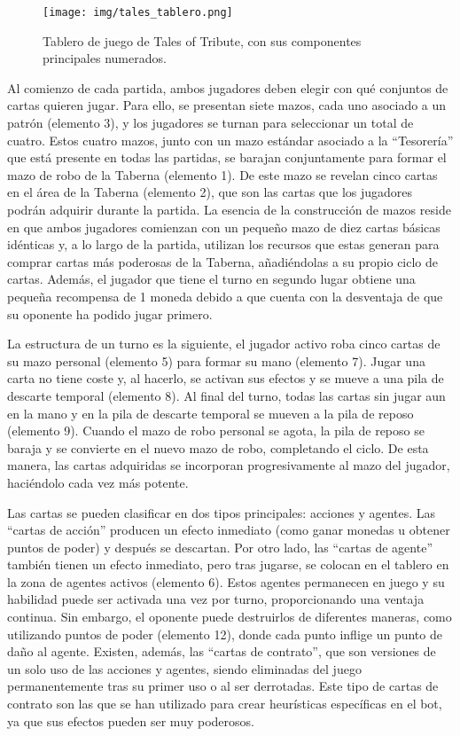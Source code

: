 \begin{figure}[H]
	\centering
	\texttt{[image: img/tales\_tablero.png]}
	\caption{Tablero de juego de Tales of Tribute, con sus componentes principales numerados. \cite{pixel_eso_2022}}
	\label{fig:tales_tablero}
\end{figure}

Al comienzo de cada partida, ambos jugadores deben elegir con qué conjuntos de cartas quieren jugar. Para ello, se presentan siete mazos, cada uno asociado a un patrón (elemento 3), y los jugadores se turnan para seleccionar un total de cuatro. Estos cuatro mazos, junto con un mazo estándar asociado a la ``Tesorería'' que está presente en todas las partidas, se barajan conjuntamente para formar el mazo de robo de la Taberna (elemento 1). De este mazo se revelan cinco cartas en el área de la Taberna (elemento 2), que son las cartas que los jugadores podrán adquirir durante la partida. La esencia de la construcción de mazos reside en que ambos jugadores comienzan con un pequeño mazo de diez cartas básicas idénticas y, a lo largo de la partida, utilizan los recursos que estas generan para comprar cartas más poderosas de la Taberna, añadiéndolas a su propio ciclo de cartas. Además, el jugador que tiene el turno en segundo lugar obtiene una pequeña recompensa de 1 moneda debido a que cuenta con la desventaja de que su oponente ha podido jugar primero.

La estructura de un turno es la siguiente, el jugador activo roba cinco cartas de su mazo personal (elemento 5) para formar su mano (elemento 7). Jugar una carta no tiene coste y, al hacerlo, se activan sus efectos y se mueve a una pila de descarte temporal (elemento 8). Al final del turno, todas las cartas sin jugar aun en la mano y en la pila de descarte temporal se mueven a la pila de reposo (elemento 9). Cuando el mazo de robo personal se agota, la pila de reposo se baraja y se convierte en el nuevo mazo de robo, completando el ciclo. De esta manera, las cartas adquiridas se incorporan progresivamente al mazo del jugador, haciéndolo cada vez más potente.

Las cartas se pueden clasificar en dos tipos principales: acciones y agentes. Las ``cartas de acción'' producen un efecto inmediato (como ganar monedas u obtener puntos de poder) y después se descartan. Por otro lado, las ``cartas de agente'' también tienen un efecto inmediato, pero tras jugarse, se colocan en el tablero en la zona de agentes activos (elemento 6). Estos agentes permanecen en juego y su habilidad puede ser activada una vez por turno, proporcionando una ventaja continua. Sin embargo, el oponente puede destruirlos de diferentes maneras, como utilizando puntos de poder (elemento 12), donde cada punto inflige un punto de daño al agente. Existen, además, las ``cartas de contrato'', que son versiones de un solo uso de las acciones y agentes, siendo eliminadas del juego permanentemente tras su primer uso o al ser derrotadas. Este tipo de cartas de contrato son las que se han utilizado para crear heurísticas específicas en el bot, ya que sus efectos pueden ser muy poderosos.

